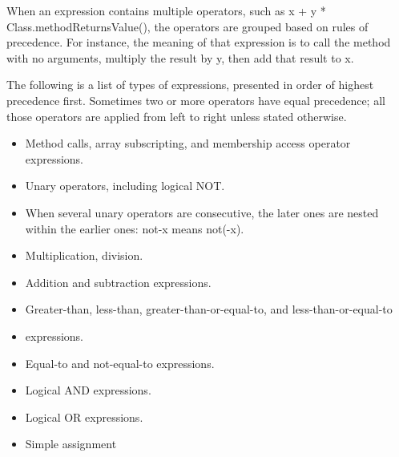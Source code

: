 \begin{homeworkProblem}
	When an expression contains multiple operators, such as x + y * Class.methodReturnsValue(), the operators are grouped based on rules of precedence. For instance, the meaning of that expression is to call the method with no arguments, multiply the result by y, then add that result to x. 
	
	The following is a list of types of expressions, presented in order of highest precedence first. Sometimes two or more operators have equal precedence; all those operators are applied from left to right unless stated otherwise.
	
	\begin{itemize}
		\item Method calls, array subscripting, and membership access operator expressions.
		\item Unary operators, including logical NOT.
		\item When several unary operators are consecutive, the later ones are nested within the earlier ones: not-x means not(-x).
		\item Multiplication, division.
		\item Addition and subtraction expressions.
		\item Greater-than, less-than, greater-than-or-equal-to, and less-than-or-equal-to
		\item expressions.
		\item Equal-to and not-equal-to expressions.
		\item Logical AND expressions.
		\item Logical OR expressions.
		\item Simple assignment	\end{itemize}

	
\end{homeworkProblem}
